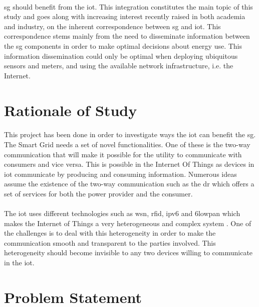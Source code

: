 \documentclass[12pt,a4paper,final]{report}
\begin{document}
\paragraph{}
\gls{sg} should benefit from the \gls{iot}. This integration constitutes the main topic of this study and goes along with increasing interest recently raised in both academia and industry, on the inherent correspondence between \gls{sg} and \gls{iot}. This  correspondence stems mainly from the need to disseminate information between the \gls{sg} components in order to make optimal decisions about energy use. This information dissemination could only be optimal when deploying ubiquitous sensors and meters, and using the available network infrastructure, i.e. the Internet.   


\section{Rationale of Study}
\paragraph{}
This project has been done in order to investigate ways the \gls{iot} can benefit the \gls{sg}. The Smart Grid needs a set of novel functionalities. One of these is the two-way communication that will make it possible for the utility to communicate with consumers and vice versa. This is possible in the Internet Of Things as devices in \gls{iot} communicate by producing and consuming information. Numerous ideas assume the existence of the two-way communication such as the \gls{dr} which offers a set of services for both the power provider and the consumer.
\paragraph{}
The \gls{iot} uses different technologies such as \gls{wsn}, \gls{rfid}, \gls{ipv6} and \gls{6lowpan} which makes the Internet of Things a very heterogeneous and complex system \cite{ref4}. One of the challenges is to deal with this heterogeneity in order to make the communication smooth and transparent to the parties involved. This heterogeneity should become invisible to any two devices willing to communicate in the \gls{iot}.

\section{Problem Statement}
\end{document}
